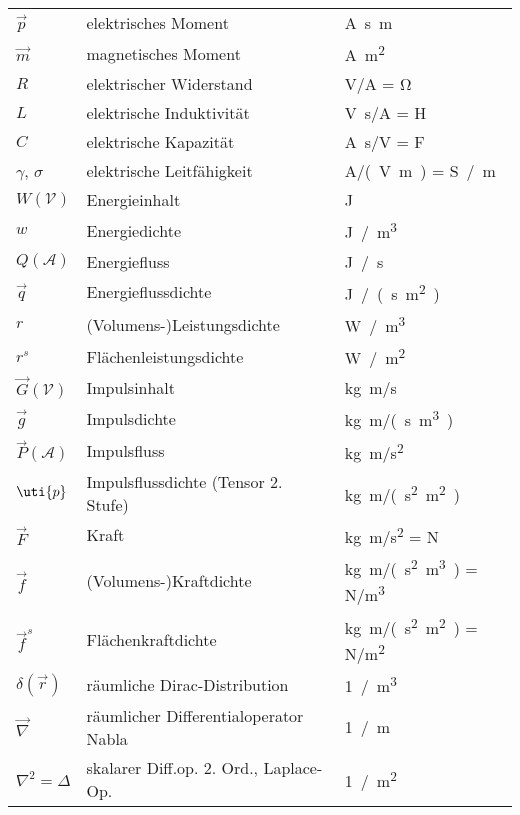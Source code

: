 \begin{tabular}{L{2cm}lL{4cm}}
	$\vec{p}$       &elektrisches Moment               &\si{\A \s \m}    \\
	$\vec{m}$       &magnetisches Moment               &\si{\A \m^2}    \\
	$R$             &elektrischer Widerstand           &\si{\V / \A} = \si{\ohm} \\
	$L$             &elektrische Induktivität          &\si{\V \s / \A} = \si{H} \\
	$C$             &elektrische Kapazität             &\si{\A \s / \V} = \si{F} \\
	$\gamma$, $\sigma$  &elektrische Leitfähigkeit     &\si{\A / (\V \m)} = \si{S / \m}  \\
	$W(\mathcal{V})$    &Energieinhalt                 &\si{J} \\
	$w$             &Energiedichte                     &\si{J / \m^3} \\
	$Q(\mathcal{A})$     &Energiefluss                 &\si{J / \s} \\
	$\vec{q}$       &Energieflussdichte                &\si{J / (\s \m^2)} \\
	$r$             &(Volumens-)Leistungsdichte        &\si{W / \m^3} \\
	$r^s$           &Flächenleistungsdichte            &\si{W / \m^2} \\
	$\vec{G}(\mathcal{V})$       &Impulsinhalt         &\si{\kg \m / \s} \\
	$\vec{g}$       &Impulsdichte                      &\si{\kg \m / (\s \m^3)} \\
	$\vec{P}(\mathcal{A})$       &Impulsfluss          &\si{\kg \m / \s^2} \\
	$\uti{p}$       &Impulsflussdichte (Tensor 2. Stufe)            &\si{\kg \m / (\s^2 \m^2)} \\
	$\vec{F}$       &Kraft                             &\si{\kg \m / \s^2} = \si{\N} \\
	$\vec{f}$       &(Volumens-)Kraftdichte            &\si{\kg \m / (\s^2 \m^3)} = \si{\N / \m^3} \\
	$\vec{f}^s$     &Flächenkraftdichte                &\si{\kg \m / (\s^2 \m^2)} = \si{\N / \m^2} \\
	$\delta(\vec{r})$    &räumliche Dirac-Distribution              &\si{1 / \m^3}  \\
	$\vec{\nabla}$  &räumlicher Differentialoperator Nabla          &\si{1 / \m}  \\
	$\nabla^2 = \Delta$  &skalarer Diff.op. 2. Ord., Laplace-Op.    &\si{1 / \m^2}  \\

\end{tabular}

